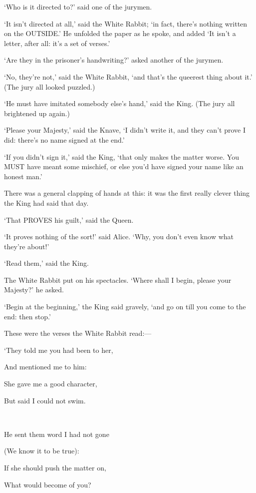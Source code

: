 \documentclass[12pt]{book}
\begin{document}
\begin{Parallel}[p]{}{}
{‘Who is it directed to?’ said one of the jurymen.

‘It isn’t directed at all,’ said the White Rabbit; ‘in fact, there’s nothing written on the OUTSIDE.’ He unfolded the paper as he spoke, and added ‘It isn’t a letter, after all: it’s a set of verses.’

‘Are they in the prisoner’s handwriting?’ asked another of the jurymen.

‘No, they’re not,’ said the White Rabbit, ‘and that’s the queerest thing about it.’ (The jury all looked puzzled.)

‘He must have imitated somebody else’s hand,’ said the King. (The jury all brightened up again.)

‘Please your Majesty,’ said the Knave, ‘I didn’t write it, and they can’t prove I did: there’s no name signed at the end.’

‘If you didn’t sign it,’ said the King, ‘that only makes the matter worse. You MUST have meant some mischief, or else you’d have signed your name like an honest man.’

There was a general clapping of hands at this: it was the first really clever thing the King had said that day.

‘That PROVES his guilt,’ said the Queen.

‘It proves nothing of the sort!’ said Alice. ‘Why, you don’t even know what they’re about!’

‘Read them,’ said the King.

The White Rabbit put on his spectacles. ‘Where shall I begin, please your Majesty?’ he asked.

‘Begin at the beginning,’ the King said gravely, ‘and go on till you come to the end: then stop.’

These were the verses the White Rabbit read:—\\
\par

{\setlength{\parskip}{0em}
\par\quad ‘They told me you had been to her,
\par\quad\quad And mentioned me to him:
\par\quad She gave me a good character,
\par\quad\quad But said I could not swim.
}\\
\par

{\setlength{\parskip}{0em}
\par\quad He sent them word I had not gone
\par\quad\quad (We know it to be true):
\par\quad If she should push the matter on,
\par\quad\quad What would become of you?
}\\
\par

}
\end{Parallel}
\end{document}
